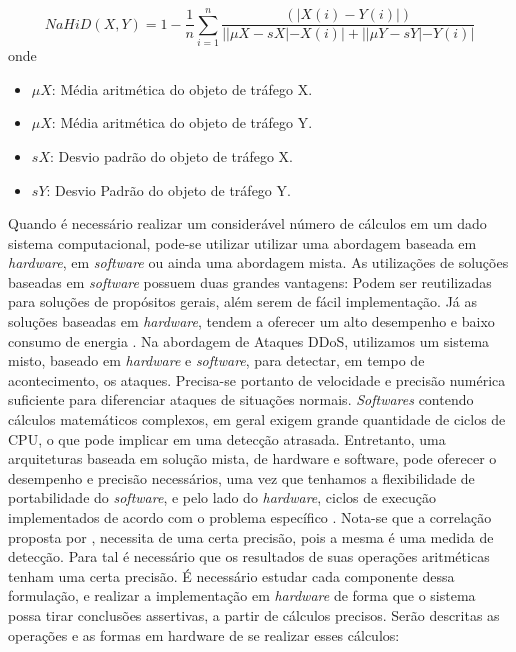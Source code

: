 \begin{equation}
NaHiD(X,Y) = 1 - \frac{1}{n} \sum_{i=1}^{n} \frac{\left(|X(i) -	 Y(i)|\right)}{||\mu{X} - sX| - X(i)| + ||\mu{Y} - sY| - Y(i)|}
\end{equation}
onde
\begin{itemize}
	\item $\mu{X}$: Média aritmética do objeto de tráfego X.
	\item $\mu{X}$: Média aritmética do objeto de tráfego Y.
	\item $sX$: Desvio padrão do objeto de tráfego X.
	\item $sY$: Desvio Padrão do objeto de tráfego Y.
\end{itemize}

Quando é necessário realizar um considerável número de cálculos em um dado sistema computacional, pode-se utilizar utilizar uma abordagem baseada em \textit{hardware}, em \textit{software} ou ainda uma abordagem mista. As utilizações de soluções baseadas em \textit{software} possuem duas grandes vantagens: Podem ser reutilizadas para soluções de propósitos gerais, além serem de fácil implementação. Já as soluções baseadas em \textit{hardware}, tendem a oferecer um alto desempenho e baixo consumo de energia \cite{HOQUE201748}.  Na abordagem de Ataques DDoS, utilizamos um sistema misto, baseado em \textit{hardware} e \textit{software}, para detectar, em tempo de acontecimento, os ataques. Precisa-se portanto de velocidade e precisão numérica suficiente para diferenciar ataques de situações normais. \textit{Softwares} contendo cálculos matemáticos complexos, em geral exigem grande quantidade de ciclos de CPU, o que pode implicar em uma detecção atrasada. Entretanto, uma arquiteturas baseada em solução mista, de hardware e software, pode oferecer o desempenho e precisão necessários, uma vez que tenhamos a flexibilidade de portabilidade do \textit{software}, e pelo lado do \textit{hardware}, ciclos de execução implementados de acordo com o problema específico \cite{miranda2002computador} . Nota-se que a correlação proposta por \cite{HOQUE201748}, necessita de uma certa precisão, pois a mesma é uma medida de detecção. Para tal é necessário que os resultados de suas operações aritméticas tenham uma certa precisão. É  necessário estudar cada componente dessa formulação, e realizar a implementação em \textit{hardware} de forma que o sistema possa tirar conclusões assertivas, a partir de cálculos precisos. Serão descritas as operações e as formas em hardware de se realizar esses cálculos:
